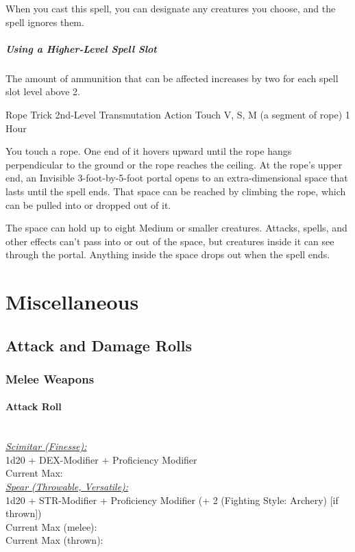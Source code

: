 \documentclass[letterpaper,openany,oneside,twocolumn]{book}
\begin{document}
When you cast this spell, you can designate any creatures you choose, and the spell ignores them.

\subparagraph*{Using a Higher-Level Spell Slot} The amount of ammunition that can be affected increases by two for each spell slot level above 2.

\DndSpellHeader
  {Rope Trick}
  {2nd-Level Transmutation}
  {Action}
  {Touch}
  {V, S, M (a segment of rope)}
  {1 Hour}

You touch a rope. One end of it hovers upward until the rope hangs perpendicular to the ground or the rope reaches the ceiling. At the rope's upper end, an Invisible 3-foot-by-5-foot portal opens to an extra-dimensional space that lasts until the spell ends. That space can be reached by climbing the rope, which can be pulled into or dropped out of it.

The space can hold up to eight Medium or smaller creatures. Attacks, spells, and other effects can't pass into or out of the space, but creatures inside it can see through the portal. Anything inside the space drops out when the spell ends.

\vfill\eject
\section*{Miscellaneous}
\subsection*{Attack and Damage Rolls}
\subsubsection*{Melee Weapons}
\paragraph*{Attack Roll}\hfill\\
\underline{\textit{Scimitar (Finesse):}}\\
1d20 + DEX-Modifier + Proficiency Modifier\\
\indent Current Max: 
\\
\underline{\textit{Spear (Throwable, Versatile):}}\\
1d20 + STR-Modifier + Proficiency Modifier (+ 2 (Fighting Style: Archery) [if thrown])\\
\indent Current Max (melee): \\
\indent Current Max (thrown): 
\end{document}
